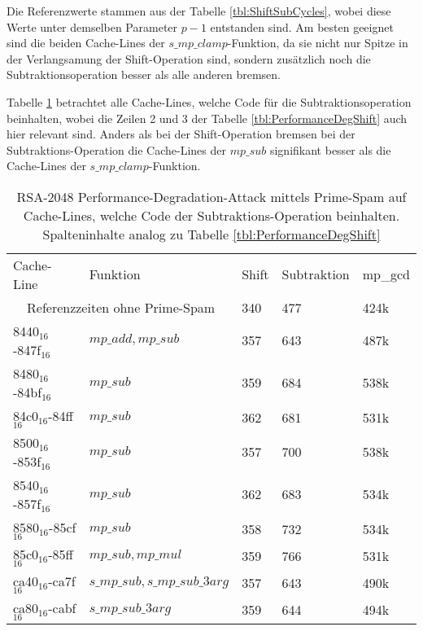 Die Referenzwerte stammen aus der Tabelle \ref{tbl:ShiftSubCycles}, wobei diese Werte unter demselben Parameter $p-1$ entstanden sind.
Am besten geeignet sind die beiden Cache-Lines der $s\_mp\_clamp$-Funktion, da sie nicht nur Spitze in der Verlangsamung der Shift-Operation sind, sondern zusätzlich noch die Subtraktionsoperation besser als alle anderen bremsen.

Tabelle \ref{tbl:PerformanceDegSub} betrachtet alle Cache-Lines, welche Code für die Subtraktionsoperation beinhalten, wobei die Zeilen 2 und 3 der Tabelle \ref{tbl:PerformanceDegShift} auch hier relevant sind.
Anders als bei der Shift-Operation bremsen bei der Subtraktions-Operation die Cache-Lines der $mp\_sub$ signifikant besser als die Cache-Lines der $s\_mp\_clamp$-Funktion.

\begin{table}[h]
\caption{RSA-2048 Performance-Degradation-Attack mittels Prime-Spam auf Cache-Lines, welche Code der Subtraktions-Operation beinhalten.
Spalteninhalte analog zu Tabelle \ref{tbl:PerformanceDegShift}}
\label{tbl:PerformanceDegSub}
\begin{tabular}{lllll}
Cache-Line & Funktion                     & Shift & Subtraktion & mp\_gcd \\[10pt]
\multicolumn{2}{c}{Referenzzeiten ohne Prime-Spam}        & 340   & 477         & 424k    \\
8440$_{16}$-847f$_{16}$  & $mp\_add, mp\_sub$             & 357   & 643         & 487k    \\
8480$_{16}$-84bf$_{16}$  & $mp\_sub$                      & 359   & 684         & 538k    \\
84c0$_{16}$-84ff$_{16}$  & $mp\_sub$                      & 362   & 681         & 531k    \\
8500$_{16}$-853f$_{16}$  & $mp\_sub$                      & 357   & 700         & 538k    \\
8540$_{16}$-857f$_{16}$  & $mp\_sub$                      & 362   & 683         & 534k    \\
8580$_{16}$-85cf$_{16}$  & $mp\_sub$                      & 358   & 732         & 534k    \\
85c0$_{16}$-85ff$_{16}$  & $mp\_sub, mp\_mul$            & 359   & 766         & 531k    \\
ca40$_{16}$-ca7f$_{16}$  & $s\_mp\_sub, s\_mp\_sub\_3arg$ & 357   & 643         & 490k    \\
ca80$_{16}$-cabf$_{16}$  & $s\_mp\_sub\_3arg$             & 359   & 644         & 494k    \\

\end{tabular}
\end{table}
